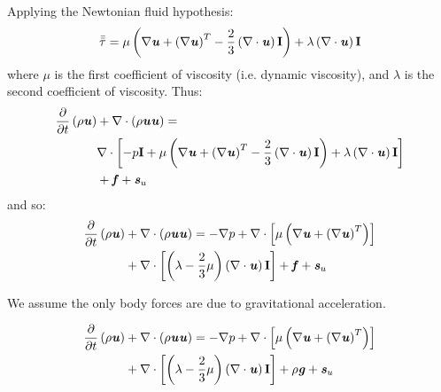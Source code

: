 Applying the Newtonian fluid hypothesis:
\begin{equation}
\bar{\bar{{\tau}}} = \mu \left( \nabla \textbf{\textit{u}} + \left(\nabla \textbf{\textit{u}} \right)^T - \frac{2}{3} \left(\nabla \cdot \textbf{\textit{u}} \right) \textbf{I} \right) + \lambda \left(\nabla \cdot \textbf{\textit{u}} \right)\textbf{I}
\end{equation}
where $\mu$ is the first coefficient of viscosity (i.e. dynamic viscosity), and $\lambda$ is the second coefficient of viscosity. Thus:
\begin{equation}
\begin{split}
\frac{\partial}{\partial t} \left(\rho \textbf{\textit{u}} \right) &+ \nabla \cdot \left(\rho \textbf{\textit{u}}\textbf{\textit{u}} \right) = \\
&\nabla \cdot \left[ -p\textbf{I} + \mu \left( \nabla \textbf{\textit{u}} + \left(\nabla \textbf{\textit{u}} \right)^T - \frac{2}{3} \left(\nabla \cdot \textbf{\textit{u}} \right) \textbf{I} \right) + \lambda \left(\nabla \cdot \textbf{\textit{u}} \right)\textbf{I}\right]\\
& + \textbf{\textit{f}} +  \textbf{\textit{s}}_{u}
\end{split}
\end{equation}
and so:
\begin{equation}
\begin{split}
\frac{\partial}{\partial t} \left(\rho \textbf{\textit{u}} \right) &+ \nabla \cdot \left(\rho \textbf{\textit{u}}\textbf{\textit{u}} \right) = - \nabla p + \nabla \cdot \left[ \mu \left( \nabla \textbf{\textit{u}} + \left(\nabla \textbf{\textit{u}} \right)^T \right) \right] \\
& + \nabla \cdot \left[ \left( \lambda - \frac{2}{3}\mu \right) \left(\nabla \cdot \textbf{\textit{u}} \right) \textbf{I} \right] +  \textbf{\textit{f}} +  \textbf{\textit{s}}_{u}
\end{split}
\end{equation}

\begin{assumption}
We assume the only body forces are due to gravitational acceleration.
\end{assumption}

\begin{equation}
\begin{split}
\frac{\partial}{\partial t} \left(\rho \textbf{\textit{u}} \right) &+ \nabla \cdot \left(\rho \textbf{\textit{u}}\textbf{\textit{u}} \right) = - \nabla p + \nabla \cdot \left[ \mu \left( \nabla \textbf{\textit{u}} + \left(\nabla \textbf{\textit{u}} \right)^T \right) \right] \\
& + \nabla \cdot \left[ \left( \lambda - \frac{2}{3}\mu \right) \left(\nabla \cdot \textbf{\textit{u}} \right) \textbf{I} \right] +  \rho \textbf{\textit{g}} +  \textbf{\textit{s}}_{u}
\end{split}
\end{equation}

